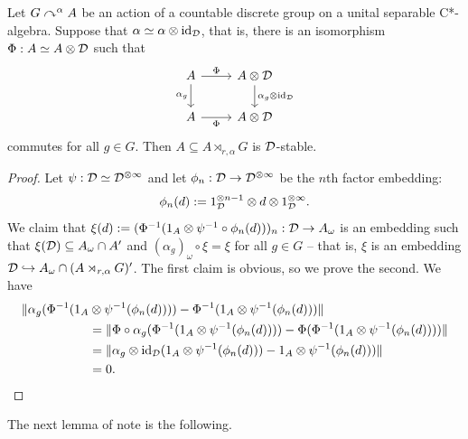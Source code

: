 \documentclass[12pt]{amsart}
\begin{document}
  \begin{prop}
    Let $G \curvearrowright^\alpha A$ be an action of a countable discrete group on a unital separable C*-algebra. Suppose that $\alpha \simeq \alpha \otimes \text{id}_{\mathcal{D}}$, that is, there is an isomorphism $\Phi: A \simeq A \otimes \mathcal{D}$ such that
\begin{equation}
 \begin{tikzcd}
A \arrow[d, "\alpha_g"'] \arrow[r, "\Phi"] & A \otimes \cD \arrow[d, "\alpha_g \otimes \id_\cD"] \\
A \arrow[r, "\Phi"']                       & A \otimes \cD                                      
\end{tikzcd}
\end{equation}
commutes for all $g \in G$. Then $A \subseteq A \rtimes_{r,\alpha} G$ is $\mathcal{D}$-stable. 
      \begin{proof}
          Let $\psi: \mathcal{D} \simeq \mathcal{D}^{\otimes \infty}$ and let $\phi_n: \mathcal{D} \to \mathcal{D}^{\otimes \infty}$ be the $n$th factor embedding:
\begin{equation}
            \phi_n(d)  := 1_{\mathcal{D}}^{\otimes n-1} \otimes d \otimes 1_{\mathcal{D}}^{\otimes \infty}.
\end{equation}
            We claim that $\xi(d) := (\Phi^{-1}(1_A \otimes \psi^{-1} \circ \phi_n(d)))_n: \mathcal{D} \to A_\omega$ is an embedding such that $\xi(\mathcal{D}) \subseteq A_\omega \cap A'$ and $(\alpha_g)_\omega \circ \xi = \xi$ for all $g \in G$ -- that is, $\xi$ is an embedding $\mathcal{D} \hookrightarrow A_\omega \cap (A \rtimes_{r,\alpha} G)'$. The first claim is obvious, so we prove the second. We have
\begin{equation}
\begin{split}
                \|\alpha_g(\Phi^{-1}(1_A &\otimes \psi^{-1}(\phi_n(d)))) -  \Phi^{-1}(1_A \otimes \psi^{-1}(\phi_n(d)))\| \\
                                         &= \|\Phi \circ \alpha_g(\Phi^{-1}(1_A \otimes \psi^{-1}(\phi_n(d)))) -  \Phi(\Phi^{-1}(1_A \otimes \psi^{-1}(\phi_n(d))))\| \\
                                         &= \|\alpha_g \otimes \text{id}_{\mathcal{D}}(1_A \otimes \psi^{-1}(\phi_n(d))) - 1_A \otimes \psi^{-1}(\phi_n(d)))\| \\
                                         &=0. 
\end{split}
\end{equation}
      \end{proof}
  \end{prop}

  The next lemma of note is the following. 
\end{document}
